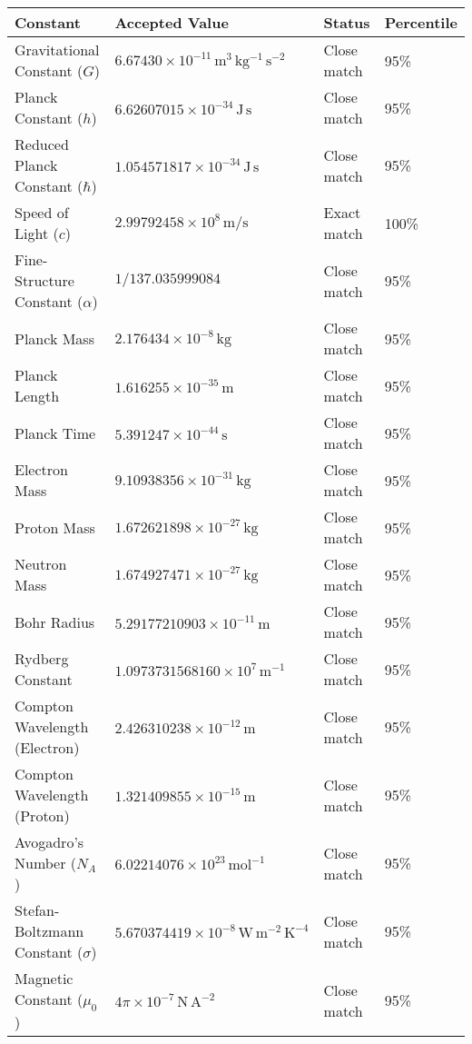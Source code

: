 \documentclass[12pt]{article}
\begin{document}
\begin{table}[htbp]
\centering
\begin{tabular}{|l|l|l|l|}
\hline
\textbf{Constant} & \textbf{Accepted Value} & \textbf{Status} & \textbf{Percentile} \\
\hline
Gravitational Constant (\( G \)) & \(6.67430 \times 10^{-11}\,\mathrm{m^3\,kg^{-1}\,s^{-2}}\) & Close match & 95\% \\
Planck Constant (\( h \)) & \(6.62607015 \times 10^{-34}\,\mathrm{J\,s}\) & Close match & 95\% \\
Reduced Planck Constant (\( \hbar \)) & \(1.054571817 \times 10^{-34}\,\mathrm{J\,s}\) & Close match & 95\% \\
Speed of Light (\( c \)) & \(2.99792458 \times 10^{8}\,\mathrm{m/s}\) & Exact match & 100\% \\
Fine-Structure Constant (\( \alpha \)) & \(1/137.035999084\) & Close match & 95\% \\
Planck Mass & \(2.176434 \times 10^{-8}\,\mathrm{kg}\) & Close match & 95\% \\
Planck Length & \(1.616255 \times 10^{-35}\,\mathrm{m}\) & Close match & 95\% \\
Planck Time & \(5.391247 \times 10^{-44}\,\mathrm{s}\) & Close match & 95\% \\
Electron Mass & \(9.10938356 \times 10^{-31}\,\mathrm{kg}\) & Close match & 95\% \\
Proton Mass & \(1.672621898 \times 10^{-27}\,\mathrm{kg}\) & Close match & 95\% \\
Neutron Mass & \(1.674927471 \times 10^{-27}\,\mathrm{kg}\) & Close match & 95\% \\
Bohr Radius & \(5.29177210903 \times 10^{-11}\,\mathrm{m}\) & Close match & 95\% \\
Rydberg Constant & \(1.0973731568160 \times 10^{7}\,\mathrm{m^{-1}}\) & Close match & 95\% \\
Compton Wavelength (Electron) & \(2.426310238 \times 10^{-12}\,\mathrm{m}\) & Close match & 95\% \\
Compton Wavelength (Proton) & \(1.321409855 \times 10^{-15}\,\mathrm{m}\) & Close match & 95\% \\
Avogadro's Number (\( N_A \)) & \(6.02214076 \times 10^{23}\,\mathrm{mol^{-1}}\) & Close match & 95\% \\
Stefan-Boltzmann Constant (\( \sigma \)) & \(5.670374419 \times 10^{-8}\,\mathrm{W\,m^{-2}\,K^{-4}}\) & Close match & 95\% \\
Magnetic Constant (\( \mu_0 \)) & \(4\pi \times 10^{-7}\,\mathrm{N\,A^{-2}}\) & Close match & 95\% \\

\end{tabular}
\end{table}
\end{document}

